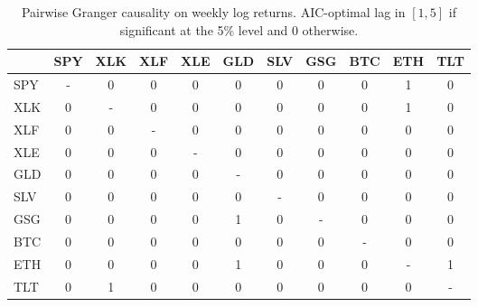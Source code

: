 \begin{table}[H]
\centering
\small
\begin{tabular}{lcccccccccc}
\toprule
 & SPY & XLK & XLF & XLE & GLD & SLV & GSG & BTC & ETH & TLT \\
\midrule
SPY & - & 0 & 0 & 0 & 0 & 0 & 0 & 0 & 1 & 0 \\
XLK & 0 & - & 0 & 0 & 0 & 0 & 0 & 0 & 1 & 0 \\
XLF & 0 & 0 & - & 0 & 0 & 0 & 0 & 0 & 0 & 0 \\
XLE & 0 & 0 & 0 & - & 0 & 0 & 0 & 0 & 0 & 0 \\
GLD & 0 & 0 & 0 & 0 & - & 0 & 0 & 0 & 0 & 0 \\
SLV & 0 & 0 & 0 & 0 & 0 & - & 0 & 0 & 0 & 0 \\
GSG & 0 & 0 & 0 & 0 & 1 & 0 & - & 0 & 0 & 0 \\
BTC & 0 & 0 & 0 & 0 & 0 & 0 & 0 & - & 0 & 0 \\
ETH & 0 & 0 & 0 & 0 & 1 & 0 & 0 & 0 & - & 1 \\
TLT & 0 & 1 & 0 & 0 & 0 & 0 & 0 & 0 & 0 & - \\
\bottomrule
\end{tabular}
\caption{Pairwise Granger causality on weekly log returns. AIC-optimal lag in $[1,5]$ if significant at the 5\% level and 0 otherwise.}
\label{tab:returns_weekly}
\end{table}